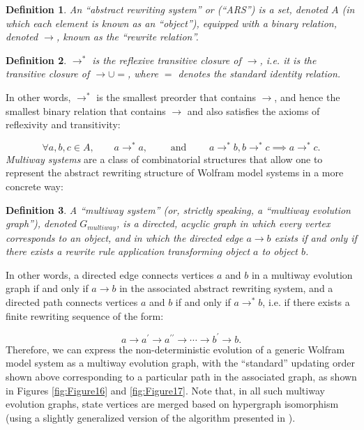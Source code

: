 \documentclass{article}
\newtheorem{definition}{Definition}
\begin{document}
\begin{definition}
An ``abstract rewriting system'' or (``ARS'') is a set, denoted $A$ (in which each element is known as an ``object''), equipped with a binary relation, denoted ${\to}$, known as the ``rewrite relation''.
\end{definition}

\begin{definition}
${\to^{*}}$ is the reflexive transitive closure of ${\to}$, i.e. it is the transitive closure of ${\to \cup =}$, where $=$ denotes the standard identity relation.
\end{definition}
In other words, ${\to^{*}}$ is the smallest preorder that contains ${\to}$, and hence the smallest binary relation that contains ${\to}$ and also satisfies the axioms of reflexivity and transitivity:

\begin{equation}
\forall a, b, c \in A, \qquad a \to^{*} a, \qquad \text{ and } \qquad a \to^{*} b, b \to^{*} c \implies a \to^{*} c.
\end{equation}
\textit{Multiway systems} are a class of combinatorial structures that allow one to represent the abstract rewriting structure of Wolfram model systems in a more concrete way:

\begin{definition}
A ``multiway system'' (or, strictly speaking, a ``multiway evolution graph''), denoted ${G_{multiway}}$, is a directed, acyclic graph in which every vertex corresponds to an object, and in which the directed edge ${a \to b}$ exists if and only if there exists a rewrite rule application transforming object $a$ to object $b$.
\end{definition}
In other words, a directed edge connects vertices $a$ and $b$ in a multiway evolution graph if and only if ${a \to b}$ in the associated abstract rewriting system, and a directed path connects vertices $a$ and $b$ if and only if ${a \to^{*} b}$, i.e. if there exists a finite rewriting sequence of the form:

\begin{equation}
a \to a^{\prime} \to a^{\prime \prime} \to \cdots \to b^{\prime} \to b.
\end{equation}
Therefore, we can express the non-deterministic evolution of a generic Wolfram model system as a multiway evolution graph, with the ``standard'' updating order shown above corresponding to a particular path in the associated graph, as shown in Figures \ref{fig:Figure16} and \ref{fig:Figure17}. Note that, in all such multiway evolution graphs, state vertices are merged based on hypergraph isomorphism (using a slightly generalized version of the algorithm presented in \cite{gorard3}).
\end{document}
